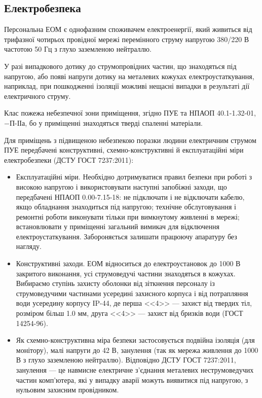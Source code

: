 \subsection{Електробезпека}
Персональна ЕОМ є однофазним споживачем електроенергії, який живиться від трифазної чотирьох провідної мережі перемінного струму напругою 380/220 В частотою 50 Гц з глухо заземленою нейтраллю.

У разі випадкового дотику до струмопровідних частин, що знаходяться під напругою, або появі напруги дотику на металевих кожухах електроустаткування, наприклад, при пошкодженні ізоляції можливі нещасні випадки в результаті дії електричного струму.

Клас пожежа небезпечної зони приміщення, згідно ПУЕ та НПАОП 40.1-1.32-01, −П-ІІа, бо у приміщенні знаходяться тверді спаленні матеріали.

Для приміщень з підвищеною небезпекою поразки людини електричним струмом ПУЕ передбачені конструктивні, схемно-конструктивні й експлуатаційні міри електробезпеки (ДСТУ ГОСТ 7237:2011):%
\begin{itemize}
	\item Експлуатаційні міри. Необхідно дотримуватися правил безпеки при роботі з високою напругою і використовувати наступні запобіжні заходи, що передбачені НПАОП 0.00-7.15-18: не підключати і не відключати кабелю, якщо обладнання знаходиться під напругою; технічне обслуговування і ремонтні роботи виконувати тільки при вимкнутому живленні в мережі; встановлювати у приміщенні загальний вимикач для відключення електроустаткування. Забороняється залишати працюючу апаратуру без нагляду.
	\item Конструктивні заходи. ЕОМ відноситься до електроустановок до 1000 В закритого виконання, усі струмоведучі частини знаходяться в кожухах. Вибираємо ступінь захисту оболонки від зіткнення персоналу із струмоведучими частинами усередині захисного корпуса і від потрапляння води усередину корпусу ІP-44, де перша <<4>> --- захист від твердих тіл, розміром більш 1.0 мм, друга <<4>> --- захист від бризків води (ГОСТ 14254-96).
	\item Як схемно-конструктивна міра безпеки застосовується подвійна ізоляція (для монітору), малі напруги до 42 В, занулення (так як мережа живлення до 1000 В з глухо заземленою нейтраллю). Відповідно ДСТУ ГОСТ 7237:2011, занулення --- це навмисне електричне з'єднання металевих неструмоведучих частин комп'ютера, які у випадку аварії можуть виявитися під напругою, з нульовим захисним провідником.
\end{itemize}

